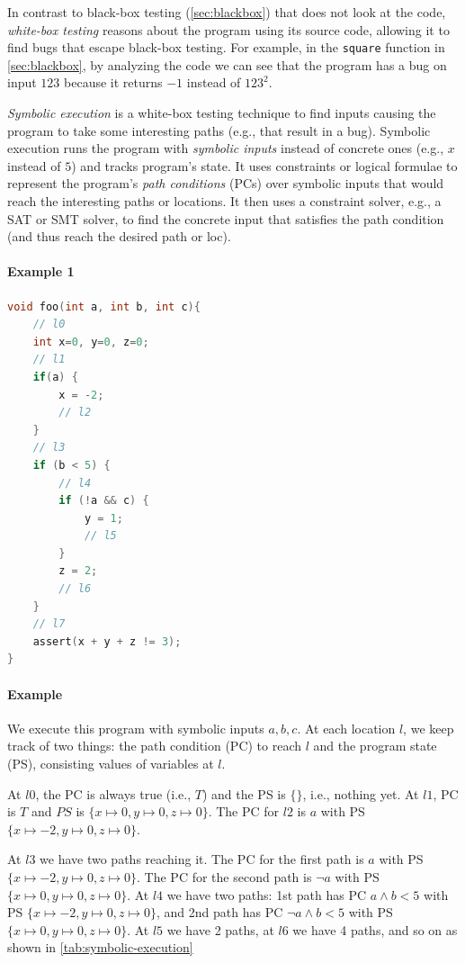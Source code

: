 \documentclass[oneside,11pt,dvipsnames]{book}
\newcommand{\code}[1]{\texttt{#1}}
\begin{document}
In contrast to black-box testing (\autoref{sec:blackbox}) that does not look at the code, \emph{white-box testing} reasons about the program using its source code, allowing it to find bugs that escape black-box testing.  For example, in the \code{square} function in \autoref{sec:blackbox}, by analyzing the code we can see that the program has a bug on input $123$ because it returns $-1$ instead of ${123}^2$. 


\emph{Symbolic execution} is a white-box testing technique to find inputs causing the program to take some interesting paths (e.g., that result in a bug). Symbolic execution runs the program with \emph{symbolic inputs} instead of concrete ones (e.g., $x$ instead of $5$) and tracks program's state. It uses constraints or logical formulae to represent the program's \emph{path conditions} (PCs) over symbolic inputs that would reach the interesting paths or locations. It then uses a constraint solver, e.g., a SAT or SMT solver, to find the concrete input that satisfies the path condition (and thus reach the desired path or loc). 
\paragraph{Example 1}
\begin{lstlisting}[language=c]
void foo(int a, int b, int c){    
    // l0
    int x=0, y=0, z=0;
    // l1
    if(a) {        
        x = -2;
        // l2
    }
    // l3
    if (b < 5) {
        // l4 
        if (!a && c) {            
            y = 1; 
            // l5
        }        
        z = 2;
        // l6 
    }
    // l7
    assert(x + y + z != 3);
}
\end{lstlisting}

\paragraph{Example} We execute this program with symbolic inputs $a, b, c$.  At each location $l$,  we keep track of two things: the path condition (PC) to reach $l$ and the program state (PS), consisting values of variables at $l$.

At $l0$, the PC is always true (i.e., $T$) and the PS is $\{\}
$, i.e., nothing yet. At $l1$, PC is $T$ and $PS$ is $\{x\mapsto 0, y\mapsto 0, z\mapsto 0\}$. The PC for $l2$ is $a$ with PS $\{x\mapsto -2,y\mapsto 0,z\mapsto 0\}$.  

At $l3$ we have two paths reaching it.  The PC for the first path is $a$ with PS $\{x\mapsto -2,y\mapsto 0,z\mapsto 0\}$. The PC for the second path is $\lnot a$ with PS $\{x\mapsto 0,y\mapsto 0,z\mapsto 0\}$.
At $l4$ we have two paths: 1st path has PC $a \land b < 5$ with PS $\{x\mapsto -2,y\mapsto 0,z\mapsto 0\}$, and 2nd path has PC $\lnot a \land b < 5$ with PS $\{x\mapsto 0,y\mapsto0,z\mapsto 0\}$. At $l5$ we have 2 paths, at $l6$ we have 4 paths, and so on as shown in \autoref{tab:symbolic-execution}
\end{document}
